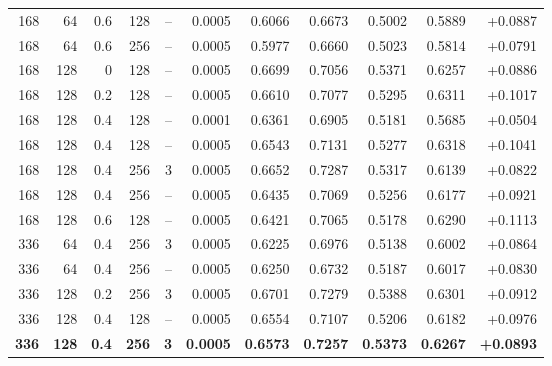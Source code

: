 \begin{table}[H]
\begin{tabular}{rrrrrr r r rrr}
  168 & 64 & 0.6 & 128 & -- & 0.0005 & 0.6066 & 0.6673 & 0.5002 & 0.5889 & +0.0887 \\
  168 & 64 & 0.6 & 256 & -- & 0.0005 & 0.5977 & 0.6660 & 0.5023 & 0.5814 & +0.0791 \\
  168 & 128 & 0 & 128 & -- & 0.0005 & 0.6699 & 0.7056 & 0.5371 & 0.6257 & +0.0886 \\
  168 & 128 & 0.2 & 128 & -- & 0.0005 & 0.6610 & 0.7077 & 0.5295 & 0.6311 & +0.1017 \\
  168 & 128 & 0.4 & 128 & -- & 0.0001 & 0.6361 & 0.6905 & 0.5181 & 0.5685 & +0.0504 \\
  168 & 128 & 0.4 & 128 & -- & 0.0005 & 0.6543 & 0.7131 & 0.5277 & 0.6318 & +0.1041 \\
  168 & 128 & 0.4 & 256 & 3 & 0.0005 & 0.6652 & 0.7287 & 0.5317 & 0.6139 & +0.0822 \\
  168 & 128 & 0.4 & 256 & -- & 0.0005 & 0.6435 & 0.7069 & 0.5256 & 0.6177 & +0.0921 \\
  168 & 128 & 0.6 & 128 & -- & 0.0005 & 0.6421 & 0.7065 & 0.5178 & 0.6290 & +0.1113 \\
  336 & 64 & 0.4 & 256 & 3 & 0.0005 & 0.6225 & 0.6976 & 0.5138 & 0.6002 & +0.0864 \\
  336 & 64 & 0.4 & 256 & -- & 0.0005 & 0.6250 & 0.6732 & 0.5187 & 0.6017 & +0.0830 \\
  336 & 128 & 0.2 & 256 & 3 & 0.0005 & 0.6701 & 0.7279 & 0.5388 & 0.6301 & +0.0912 \\
  336 & 128 & 0.4 & 128 & -- & 0.0005 & 0.6554 & 0.7107 & 0.5206 & 0.6182 & +0.0976 \\
  \bfseries 336 & \bfseries 128 & \bfseries 0.4 & \bfseries 256 & \bfseries 3 & \bfseries 0.0005 & \bfseries 0.6573 & \bfseries 0.7257 & \bfseries 0.5373 & \bfseries 0.6267 & \bfseries +0.0893 \\
\bottomrule
\end{tabular}
\end{table}
